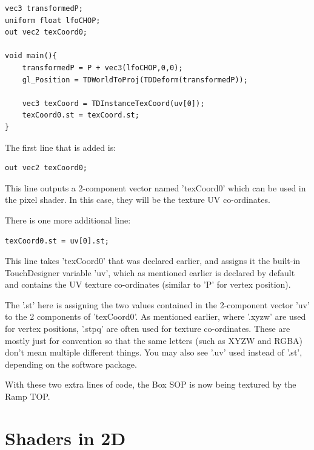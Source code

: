\begin{fullwidth}
\begin{lstlisting}
vec3 transformedP;
uniform float lfoCHOP;
out vec2 texCoord0;

void main(){
	transformedP = P + vec3(lfoCHOP,0,0);
	gl_Position = TDWorldToProj(TDDeform(transformedP));

	vec3 texCoord = TDInstanceTexCoord(uv[0]);
	texCoord0.st = texCoord.st;
}
\end{lstlisting}

The first line that is added is:

\begin{lstlisting}
out vec2 texCoord0;
\end{lstlisting}

This line outputs a 2-component vector named 'texCoord0' which can be used in the pixel shader. In this case, they will be the texture UV co-ordinates.

There is one more additional line:

\begin{lstlisting}
texCoord0.st = uv[0].st;
\end{lstlisting}

This line takes 'texCoord0' that was declared earlier, and assigns it the built-in TouchDesigner variable 'uv', which as mentioned earlier is declared by default and contains the UV texture co-ordinates (similar to 'P' for vertex position).

The '.st' here is assigning the two values contained in the 2-component vector 'uv' to the 2 components of 'texCoord0'. As mentioned earlier, where '.xyzw' are used for vertex positions, '.stpq' are often used for texture co-ordinates. These are mostly just for convention so that the same letters (such as XYZW and RGBA) don't mean multiple different things. You may also see '.uv' used instead of '.st', depending on the software package.

With these two extra lines of code, the Box SOP is now being textured by the Ramp TOP.

\end{fullwidth}


\section{Shaders in 2D}

